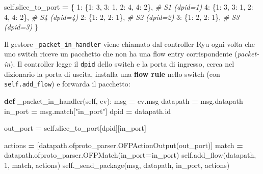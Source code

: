 \documentclass[
  italian,
  openany]{book}
\newenvironment{Shaded}{\begin{snugshade}}{\end{snugshade}}
\newcommand{\BuiltInTok}[1]{#1}
\newcommand{\CommentTok}[1]{\textcolor[rgb]{0.56,0.35,0.01}{\textit{#1}}}
\newcommand{\DecValTok}[1]{\textcolor[rgb]{0.00,0.00,0.81}{#1}}
\newcommand{\KeywordTok}[1]{\textcolor[rgb]{0.13,0.29,0.53}{\textbf{#1}}}
\newcommand{\NormalTok}[1]{#1}
\newcommand{\OperatorTok}[1]{\textcolor[rgb]{0.81,0.36,0.00}{\textbf{#1}}}
\newcommand{\StringTok}[1]{\textcolor[rgb]{0.31,0.60,0.02}{#1}}
\newcommand{\VariableTok}[1]{\textcolor[rgb]{0.00,0.00,0.00}{#1}}
\begin{document}
\begin{Shaded}
\begin{Highlighting}[]
\VariableTok{self}\NormalTok{.slice\_to\_port }\OperatorTok{=}\NormalTok{ \{}
    \DecValTok{1}\NormalTok{: \{}\DecValTok{1}\NormalTok{: }\DecValTok{3}\NormalTok{, }\DecValTok{3}\NormalTok{: }\DecValTok{1}\NormalTok{, }\DecValTok{2}\NormalTok{: }\DecValTok{4}\NormalTok{, }\DecValTok{4}\NormalTok{: }\DecValTok{2}\NormalTok{\},  }\CommentTok{\# S1 (dpid=1)}
    \DecValTok{4}\NormalTok{: \{}\DecValTok{1}\NormalTok{: }\DecValTok{3}\NormalTok{, }\DecValTok{3}\NormalTok{: }\DecValTok{1}\NormalTok{, }\DecValTok{2}\NormalTok{: }\DecValTok{4}\NormalTok{, }\DecValTok{4}\NormalTok{: }\DecValTok{2}\NormalTok{\},  }\CommentTok{\# S4 (dpid=4)}
    \DecValTok{2}\NormalTok{: \{}\DecValTok{1}\NormalTok{: }\DecValTok{2}\NormalTok{, }\DecValTok{2}\NormalTok{: }\DecValTok{1}\NormalTok{\},               }\CommentTok{\# S2 (dpid=2)}
    \DecValTok{3}\NormalTok{: \{}\DecValTok{1}\NormalTok{: }\DecValTok{2}\NormalTok{, }\DecValTok{2}\NormalTok{: }\DecValTok{1}\NormalTok{\},               }\CommentTok{\# S3 (dpid=3)}
\NormalTok{\}}
\end{Highlighting}
\end{Shaded}

Il gestore \texttt{\_packet\_in\_handler} viene chiamato dal controller
Ryu ogni volta che uno switch riceve un pacchetto che non ha una flow
entry corrispondente (\emph{packet-in}). Il controller legge il
\texttt{dpid} dello switch e la porta di ingresso, cerca nel dizionario
la porta di uscita, installa una \textbf{flow rule} nello switch (con
\texttt{self.add\_flow}) e forwarda il pacchetto:

\begin{Shaded}
\begin{Highlighting}[]
\KeywordTok{def}\NormalTok{ \_packet\_in\_handler(}\VariableTok{self}\NormalTok{, ev):}
\NormalTok{    msg }\OperatorTok{=}\NormalTok{ ev.msg}
\NormalTok{    datapath }\OperatorTok{=}\NormalTok{ msg.datapath}
\NormalTok{    in\_port }\OperatorTok{=}\NormalTok{ msg.match[}\StringTok{"in\_port"}\NormalTok{]}
\NormalTok{    dpid }\OperatorTok{=}\NormalTok{ datapath.}\BuiltInTok{id}

\NormalTok{    out\_port }\OperatorTok{=} \VariableTok{self}\NormalTok{.slice\_to\_port[dpid][in\_port]}

\NormalTok{    actions }\OperatorTok{=}\NormalTok{ [datapath.ofproto\_parser.OFPActionOutput(out\_port)]}
\NormalTok{    match }\OperatorTok{=}\NormalTok{ datapath.ofproto\_parser.OFPMatch(in\_port}\OperatorTok{=}\NormalTok{in\_port)}
    \VariableTok{self}\NormalTok{.add\_flow(datapath, }\DecValTok{1}\NormalTok{, match, actions)}
    \VariableTok{self}\NormalTok{.\_send\_package(msg, datapath, in\_port, actions)}
\end{Highlighting}
\end{Shaded}
\end{document}

